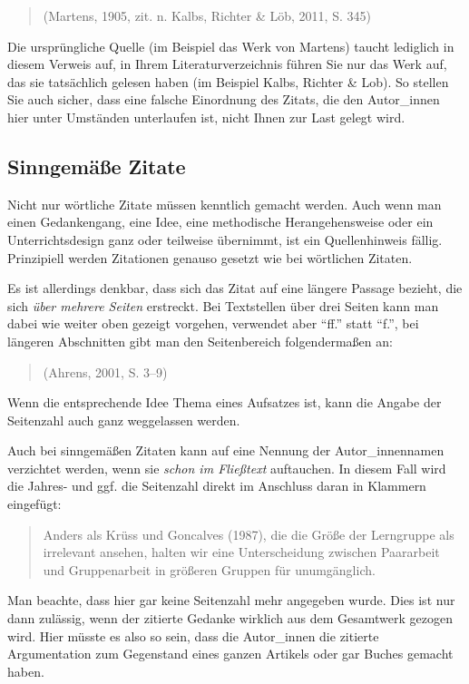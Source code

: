 \documentclass[ngerman,bibliography=totoc,oneside,12pt,a4paper]{scrbook}
\begin{document}
\begin{quote}
(Martens, 1905, zit. n. Kalbs, Richter \& Löb, 2011, S. 345)
\end{quote}

Die ursprüngliche Quelle (im Beispiel das Werk von Martens) taucht
lediglich in diesem Verweis auf, in Ihrem Literaturverzeichnis führen
Sie nur das Werk auf, das sie tatsächlich gelesen haben (im Beispiel
Kalbs, Richter \& Lob). So stellen Sie auch sicher, dass eine falsche
Einordnung des Zitats, die den Autor\_innen hier unter Umständen
unterlaufen ist, nicht Ihnen zur Last gelegt wird.

\subsection{Sinngemäße Zitate}\label{sinngemae-zitate}

Nicht nur wörtliche Zitate müssen kenntlich gemacht werden. Auch wenn
man einen Gedankengang, eine Idee, eine methodische Herangehensweise
oder ein Unterrichtsdesign ganz oder teilweise übernimmt, ist ein
Quellenhinweis fällig. Prinzipiell werden Zitationen genauso gesetzt wie
bei wörtlichen Zitaten.

Es ist allerdings denkbar, dass sich das Zitat auf eine längere Passage
bezieht, die sich \emph{über mehrere Seiten} erstreckt. Bei Textstellen
über drei Seiten kann man dabei wie weiter oben gezeigt vorgehen,
verwendet aber \enquote{ff.} statt \enquote{f.}, bei längeren
Abschnitten gibt man den Seitenbereich folgendermaßen an:

\begin{quote}
(Ahrens, 2001, S. 3--9)
\end{quote}

Wenn die entsprechende Idee Thema eines Aufsatzes ist, kann die Angabe
der Seitenzahl auch ganz weggelassen werden.

Auch bei sinngemäßen Zitaten kann auf eine Nennung der Autor\_innennamen
verzichtet werden, wenn sie \emph{schon im Fließtext} auftauchen. In
diesem Fall wird die Jahres- und ggf. die Seitenzahl direkt im Anschluss
daran in Klammern eingefügt:

\begin{quote}
Anders als Krüss und Goncalves (1987), die die Größe der Lerngruppe als
irrelevant ansehen, halten wir eine Unterscheidung zwischen Paararbeit
und Gruppenarbeit in größeren Gruppen für unumgänglich.
\end{quote}

Man beachte, dass hier gar keine Seitenzahl mehr angegeben wurde. Dies
ist nur dann zulässig, wenn der zitierte Gedanke wirklich aus dem
Gesamtwerk gezogen wird. Hier müsste es also so sein, dass die
Autor\_innen die zitierte Argumentation zum Gegenstand eines ganzen
Artikels oder gar Buches gemacht haben.
\end{document}
